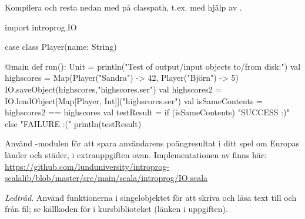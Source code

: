 \Subtask
Kompilera och resta nedan med  på classpath, t.ex. med hjälp av .
\begin{Code}
import introprog.IO

case class Player(name: String)

@main def run(): Unit = 
  println("Test of output/input objects to/from disk:")
  val highscores = Map(Player("Sandra") -> 42, Player("Björn") -> 5)
  IO.saveObject(highscores,"highscores.ser")
  val highscores2 = IO.loadObject[Map[Player, Int]]("highscores.ser")
  val isSameContents = highscores2 == highscores
  val testResult = if (isSameContents) "SUCCESS :)" else "FAILURE :("
  println(testResult)
\end{Code}

\Subtask
Använd -modulen för att spara användarens poängresultat i ditt spel om Europas länder och städer, i extrauppgiften ovan. Implementationen av  finns här: \url{https://github.com/lunduniversity/introprog-scalalib/blob/master/src/main/scala/introprog/IO.scala} 

\label{disk-access-code}
\SOLUTION

\TaskSolved \what
\emph{Ledtråd.} Använd funktionerna i singelobjektet  för att skriva och läsa text till och från fil; se källkoden för  i kursbiblioteket (länken i uppgiften).

\QUESTEND



